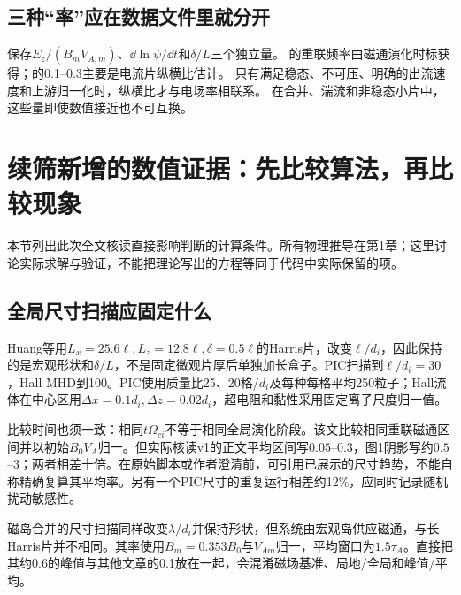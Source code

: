 \documentclass[UTF8,a4paper,11pt,openany,fontset=fandol]{ctexbook}
\begin{document}
\subsection{三种“率”应在数据文件里就分开}
保存$E_z/(B_mV_{\!A,m})$、$\dd\ln\psi/\dd t$和$\delta/L$三个独立量。
\citet{L264}的重联频率由磁通演化时标获得；\citet{F644}的0.1--0.3主要是电流片纵横比估计。
只有满足稳态、不可压、明确的出流速度和上游归一化时，纵横比才与电场率相联系。
在合并、湍流和非稳态小片中，这些量即使数值接近也不可互换。

\section{续筛新增的数值证据：先比较算法，再比较现象}
\label{sec:remaining-numerics}
本节列出此次全文核读直接影响判断的计算条件。所有物理推导在第1章；这里讨论实际求解与验证，不能把理论写出的方程等同于代码中实际保留的项。

\subsection{全局尺寸扫描应固定什么}
Huang等\citep{F600}用$L_x=25.6\ell,L_z=12.8\ell,\delta=0.5\ell$的Harris片，改变$\ell/d_i$，因此保持的是宏观形状和$\delta/L$，不是固定微观片厚后单独加长盒子。PIC扫描到$\ell/d_i=30$，Hall MHD到100。PIC使用质量比25、20格/$d_i$及每种每格平均250粒子；Hall流体在中心区用$\Delta x=0.1d_i,\Delta z=0.02d_i$，超电阻和黏性采用固定离子尺度归一值。

比较时间也须一致：相同$t\Omega_{ci}$不等于相同全局演化阶段。该文比较相同重联磁通区间并以初始$B_0V_A$归一。但实际核读v1的正文平均区间写$0.05$--$0.3$，图1阴影写约$0.5$--$3$；两者相差十倍。在原始脚本或作者澄清前，可引用已展示的尺寸趋势，不能自称精确复算其平均率。另有一个PIC尺寸的重复运行相差约12\%，应同时记录随机扰动敏感性。

磁岛合并的尺寸扫描\citep{L241}同样改变$\lambda/d_i$并保持形状，但系统由宏观岛供应磁通，与长Harris片并不相同。其率使用$B_m=0.353B_0$与$V_{Am}$归一，平均窗口为$1.5\tau_A$。直接把其约0.6的峰值与其他文章的0.1放在一起，会混淆磁场基准、局地/全局和峰值/平均。
\end{document}
